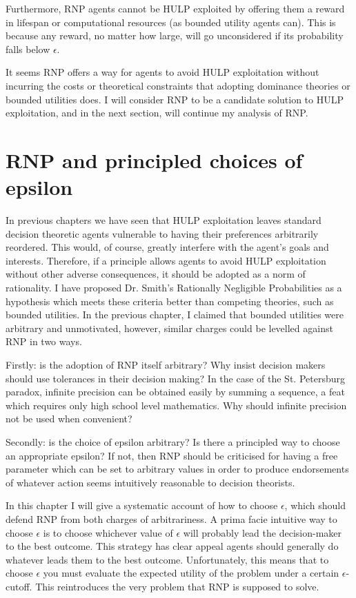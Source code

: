 \documentclass{article}
\begin{document}
Furthermore, RNP agents cannot be HULP exploited by offering them a reward in lifespan or computational resources (as bounded utility agents can). This is because any reward, no matter how large, will go unconsidered if its probability falls below \(\epsilon\).

It seems RNP offers a way for agents to avoid HULP exploitation without incurring the costs or theoretical constraints that adopting dominance theories or bounded utilities does. I will consider RNP to be a candidate solution to HULP exploitation, and in the next section, will continue my analysis of RNP.

\newpage\section{RNP and principled choices of epsilon}

In previous chapters we have seen that HULP exploitation leaves standard decision theoretic agents vulnerable to having their preferences arbitrarily reordered. This would, of course, greatly interfere with the agent's goals and interests. Therefore, if a principle allows agents to avoid HULP exploitation without other adverse consequences, it should be adopted as a norm of rationality. I have proposed Dr. Smith's Rationally Negligible Probabilities as a hypothesis which meets these criteria better than competing theories, such as bounded utilities. In the previous chapter, I claimed that bounded utilities were arbitrary and unmotivated, however, similar charges could be levelled against RNP in two ways.

Firstly: is the adoption of RNP itself arbitrary? Why insist decision makers should use tolerances in their decision making? In the case of the St. Petersburg paradox, infinite precision can be obtained easily by summing a sequence, a feat which requires only high school level mathematics. Why should infinite precision not be used when convenient?

Secondly: is the choice of epsilon arbitrary? Is there a principled way to choose an appropriate epsilon? If not, then RNP should be criticised for having a free parameter which can be set to arbitrary values in order to produce endorsements of whatever action seems intuitively reasonable to decision theorists. 

In this chapter I will give a systematic account of how to choose \(\epsilon\), which should defend RNP from both charges of arbitrariness. A prima facie intuitive way to choose \(\epsilon\) is to choose whichever value of \(\epsilon\) will probably lead the decision-maker to the best outcome. This strategy has clear appeal \textemdash{} agents should generally do whatever leads them to the best outcome. Unfortunately, this means that to choose \(\epsilon\) you must evaluate the expected utility of the problem under a certain \(\epsilon\)-cutoff. This reintroduces the very problem that RNP is supposed to solve. 
\end{document}

